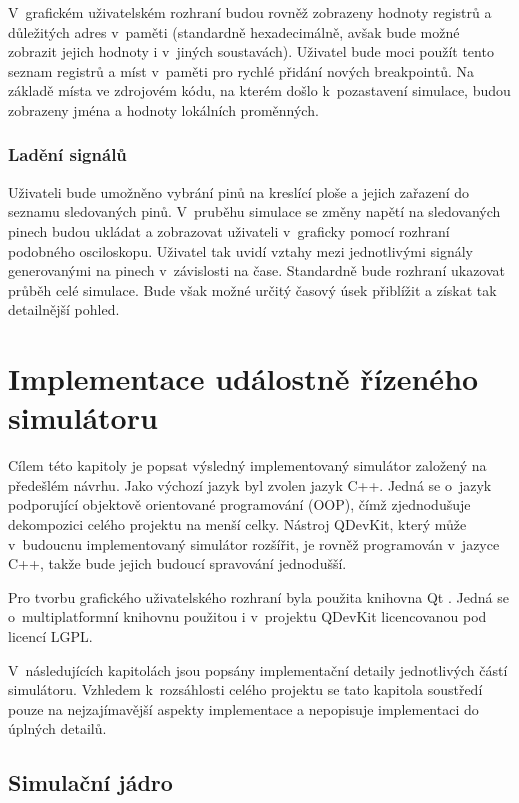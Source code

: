 V~grafickém uživatelském rozhraní budou rovněž zobrazeny hodnoty registrů a důležitých adres v~paměti (standardně hexadecimálně, avšak bude možné zobrazit jejich hodnoty i v~jiných soustavách). Uživatel bude moci použít tento seznam registrů a míst v~paměti pro rychlé přidání nových breakpointů. Na základě místa ve zdrojovém kódu, na kterém došlo k~pozastavení simulace, budou zobrazeny jména a hodnoty lokálních proměnných.

\subsection{Ladění signálů}

Uživateli bude umožněno vybrání pinů na kreslící ploše a jejich zařazení do seznamu sledovaných pinů. V~pruběhu simulace se změny napětí na sledovaných pinech budou ukládat a zobrazovat uživateli v~graficky pomocí rozhraní podobného osciloskopu. Uživatel tak uvidí vztahy mezi jednotlivými signály generovanými na pinech v~závislosti na čase. Standardně bude rozhraní ukazovat průběh celé simulace. Bude však možné určitý časový úsek přiblížit a získat tak detailnější pohled.

\chapter{Implementace událostně řízeného simulátoru}

Cílem této kapitoly je popsat výsledný implementovaný simulátor založený na předešlém návrhu. Jako výchozí jazyk byl zvolen jazyk C++. Jedná se o~jazyk podporující objektově orientované programování (OOP), čímž zjednodušuje dekompozici celého projektu na menší celky. Nástroj QDevKit, který může v~budoucnu implementovaný simulátor rozšířit, je rovněž programován v~jazyce C++, takže bude jejich budoucí spravování jednodušší.

Pro tvorbu grafického uživatelského rozhraní byla použita knihovna Qt \cite{qt}. Jedná se o~multiplatformní knihovnu použitou i v~projektu QDevKit licencovanou pod licencí LGPL.

V~následujících kapitolách jsou popsány implementační detaily jednotlivých částí simulátoru. Vzhledem k~rozsáhlosti celého projektu se tato kapitola soustředí pouze na nejzajímavější aspekty implementace a nepopisuje implementaci do úplných detailů.

\section{Simulační jádro}

